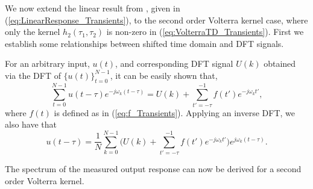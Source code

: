 We now extend the linear result from \cite{Lataire2016}, given in (\ref{eq:LinearResponse_Transients}), to the second order Volterra kernel case, where only the kernel $h_2(\tau_1,\tau_2)$ is non-zero in (\ref{eq:VolterraTD_Transients}). First we establish some relationships between shifted time domain and DFT signals.
\begin{proposition}
\label{prop:ShiftedDFT_Transients}
For an arbitrary input, $u(t)$, and corresponding DFT signal $U(k)$ obtained via the DFT of $\{u(t)\}_{t=0}^{N-1}$, it can be easily shown that,
\begin{equation}
\label{eq:ShiftedDFT1_Transients}
\sum_{t=0}^{N-1} u(t-\tau) e^{-j \omega_{k}(t-\tau)} = U(k) + \sum_{t'=-\tau}^{-1} f(t') e^{-j \omega_{k} t'},
\end{equation}
where $f(t)$ is defined as in (\ref{eq:f_Transients}). Applying an inverse DFT, we also have that
\begin{equation}
\label{eq:ShiftedDFT2_Transients}
u(t-\tau) = \frac{1}{N} \sum_{k=0}^{N-1}\big( U(k) + \sum_{t'=-\tau}^{-1} f(t') e^{-j \omega_{k} t'} \big) e^{j \omega_{k}(t-\tau)}.
\end{equation}
\end{proposition}

The spectrum of the measured output response can now be derived for a second order Volterra kernel.

